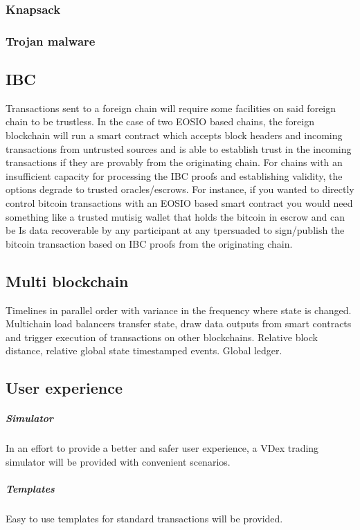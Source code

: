 \documentclass[]{article}
\begin{document}
		\subsubsection{Knapsack}  
		\subsubsection{Trojan malware}
		
		
		
	\subsection{IBC}
	
	Transactions sent to a foreign chain will require some facilities on said foreign chain to be trustless. 
	In the case of two EOSIO based chains, the foreign blockchain will run a smart contract which accepts block headers and incoming transactions from untrusted sources and is able to establish trust in the incoming transactions if they are provably from the originating chain. 
	For chains with an insufficient capacity for processing the IBC proofs and establishing validity, the options degrade to trusted oracles/escrows.
	For instance, if you wanted to directly control bitcoin transactions with an EOSIO based smart contract you would need something like a trusted mutisig wallet that holds the bitcoin in escrow and can be 	Is data recoverable by any participant at any tpersuaded to sign/publish the bitcoin transaction based on IBC proofs from the originating chain.
	
	\subsection{Multi blockchain}
	Timelines in parallel order with variance in the frequency where state is changed.
	Multichain load balancers transfer state, draw data outputs from smart contracts and 
	trigger execution of transactions on other blockchains. 
	Relative block distance, relative global state timestamped events.
	Global ledger.
		
	\subsection{User experience}
	\subparagraph{Simulator}
	In an effort to provide a better and safer user experience, 
	a VDex trading simulator will be provided with convenient scenarios.
	\subparagraph{Templates}
	Easy to use templates for standard transactions will be provided.
\end{document}
